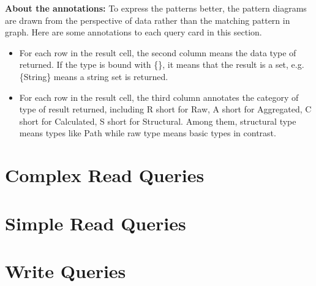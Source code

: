 {\flushleft \textbf{About the annotations:}} To express the patterns better, the
pattern diagrams are drawn from the perspective of data rather than the matching
pattern in graph. Here are some annotations to each query card in this section.
\begin{itemize}
      \item For each row in the result cell, the second column means the data
      type of returned. If the type is bound with \{\}, it means that the
      result is a set, e.g. \{String\} means a string set is returned.
      \item For each row in the result cell, the third column annotates the
      category of type of result returned, including R short for Raw, A short
      for Aggregated, C short for Calculated, S short for Structural. Among
      them, structural type means types like Path while raw type means basic
      types in contrast.
\end{itemize}


\section{Complex Read Queries}
\label{sec:complex-read-queries}




\section{Simple Read Queries}
\label{sec:simple-read-queries}




\section{Write Queries}
\label{sec:write-queries}



